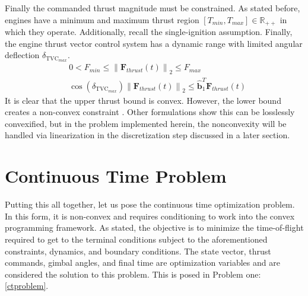 \documentclass[conf]{new-aiaa}
\begin{document}
Finally the commanded thrust magnitude must be constrained. As stated before, engines have a minimum and maximum thrust region $[T_{min}, T_{max}] \in \mathbb{R}_{++}$ in which they operate. Additionally, recall the single-ignition assumption. Finally, the engine thrust vector control system has a dynamic range with limited angular deflection $\delta_{\text{TVC}_{max}}$.
\begin{align}
& 0 < F_{min} \leq \left \lVert \bm{F}_{thrust}(t) \right \lVert_2 \leq F_{max} \\
& \cos(\delta_{\text{TVC}_{max}}) \left \lVert \bm{F}_{thrust}(t) \right \lVert_2 \leq \hat{\bm{b}}_1^T \bm{F}_{thrust}(t)
\end{align}
It is clear that the upper thrust bound is convex. However, the lower bound creates a non-convex constraint \cite{accikmecse2011lossless}. Other formulations show this can be losslessly convexified, but in the problem implemented herein, the nonconvexity will be handled via linearization in the discretization step discussed in a later section.

%
\section{Continuous Time Problem}
Putting this all together, let us pose the continuous time optimization problem. In this form, it is non-convex and requires conditioning to work into the convex programming framework. As stated, the objective is to minimize the time-of-flight required to get to the terminal conditions subject to the aforementioned constraints, dynamics, and boundary conditions. The state vector, thrust commands, gimbal angles, and final time are optimization variables and are considered the solution to this problem. This is posed in Problem one: \ref{ctproblem}.
\end{document}
